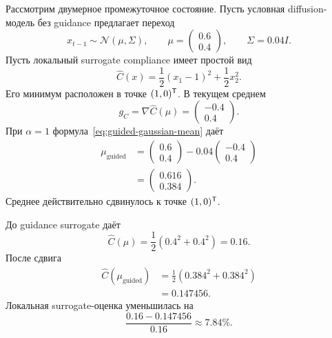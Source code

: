 Рассмотрим двумерное промежуточное состояние. Пусть условная diffusion-модель без guidance предлагает переход
\begin{equation}
 x_{t-1}
 \sim
 \mathcal N(\mu,\Sigma),
 \qquad
 \mu=
 \begin{pmatrix}
 0.6\\
 0.4
 \end{pmatrix},
 \qquad
 \Sigma=0.04I.
\end{equation}
Пусть локальный surrogate compliance имеет простой вид
\begin{equation}
 \widehat C(x)
 =
 \frac12(x_1-1)^2
 +\frac12x_2^2.
\end{equation}
Его минимум расположен в точке $(1,0)^{\mathsf{T}}$. В текущем среднем
\begin{equation}
 g_C
 =
 \nabla\widehat C(\mu)
 =
 \begin{pmatrix}
 -0.4\\
 0.4
 \end{pmatrix}.
\end{equation}
При $\alpha=1$ формула~\eqref{eq:guided-gaussian-mean} даёт
\begin{equation}
 \begin{aligned}
 \mu_{\mathrm{guided}}
 &=
 \begin{pmatrix}
 0.6\\
 0.4
 \end{pmatrix}
 -0.04
 \begin{pmatrix}
 -0.4\\
 0.4
 \end{pmatrix}\\
 &=
 \boxed{
 \begin{pmatrix}
 0.616\\
 0.384
 \end{pmatrix}}
 .
 \end{aligned}
\end{equation}
Среднее действительно сдвинулось к точке $(1,0)^{\mathsf{T}}$.

До guidance surrogate даёт
\begin{equation}
 \widehat C(\mu)
 =
 \frac12(0.4^2+0.4^2)
 =0.16.
\end{equation}
После сдвига
\begin{equation}
 \begin{aligned}
 \widehat C(\mu_{\mathrm{guided}})
 &=
 \frac12(0.384^2+0.384^2)\\
 &=0.147456.
 \end{aligned}
\end{equation}
Локальная surrogate-оценка уменьшилась на
\begin{equation}
 \frac{0.16-0.147456}{0.16}
 \approx
 7.84\%.
\end{equation}

